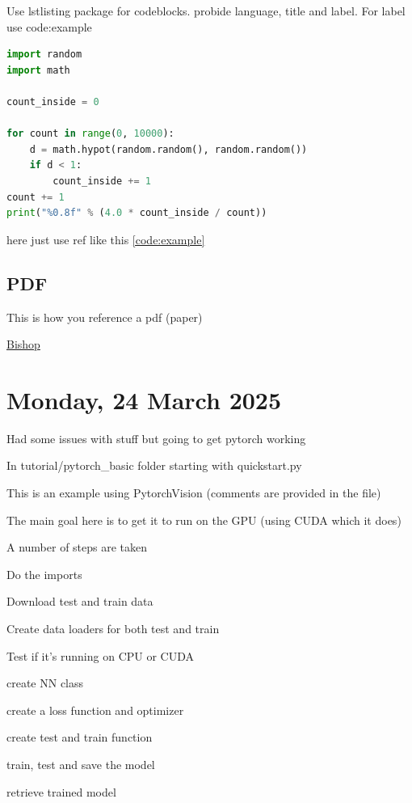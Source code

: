 Use lstlisting package for codeblocks. probide language, title and label. For label use code:example

\begin{lstlisting}[language=Python,title={Monte Carlo approximation of $\pi$},label={code:example}]
import random
import math

count_inside = 0

for count in range(0, 10000):
    d = math.hypot(random.random(), random.random())
    if d < 1:
        count_inside += 1
count += 1
print("%0.8f" % (4.0 * count_inside / count))
\end{lstlisting}

here just use ref like this \ref{code:example}

\subsection{PDF}

This is how you reference a pdf (paper)

\href{./papers/bishop2016pattern.pdf}{Bishop} \cite{bishop2016pattern}

\pendsign

\section[2025/03/24]{Monday, 24 March 2025}
\label{sec:20250324}

Had some issues with stuff but going to get pytorch working

In tutorial/pytorch\_basic folder starting with quickstart.py

This is an example using PytorchVision (comments are provided in the file)

The main goal here is to get it to run on the GPU (using CUDA which it does)

A number of steps are taken

\begin{compactitem}
	\item Do the imports
	\item Download test and train data
	\item Create data loaders for both test and train
	\item Test if it's running on CPU or CUDA
	\item create NN class
	\item create a loss function and optimizer
	\item create test and train function
	\item train, test and save the model
	\item retrieve trained model
\end{compactitem}


